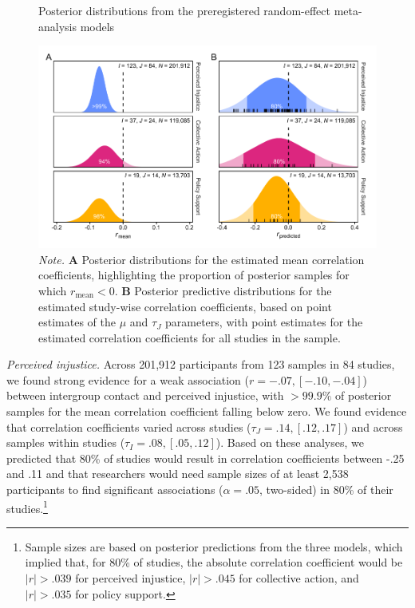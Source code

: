 \documentclass[twocolumn, 10pt, letterpaper]{article}
\begin{document}
\begin{figure}
\centering
\caption{Posterior distributions from the preregistered random-effect meta-analysis models}
\includegraphics[scale=1]{../figures/figure-3}
\caption*{\textit{Note.} \textbf{A} Posterior distributions for the estimated mean correlation coefficients, highlighting the proportion of posterior samples for which $r_\text{mean} < 0$. \textbf{B} Posterior predictive distributions for the estimated study-wise correlation coefficients, based on point estimates of the $\mu$ and $\tau_J$ parameters, with point estimates for the estimated correlation coefficients for all studies in the sample.}
\label{fig:f3}
\end{figure}

\emph{Perceived injustice.} Across 201,912 participants from 123 samples
in 84 studies, we found strong evidence for a weak association
(\(r = -.07, [-.10, -.04]\)) between intergroup contact and perceived
injustice, with \(>99.9\%\) of posterior samples for the mean
correlation coefficient falling below zero. We found evidence that
correlation coefficients varied across studies
(\(\tau_J = .14, [.12, .17]\)) and across samples within studies
(\(\tau_I = .08, [.05, .12]\)). Based on these analyses, we predicted
that 80\% of studies would result in correlation coefficients between
-.25 and .11 and that researchers would need sample sizes of at least
2,538 participants to find significant associations (\(\alpha = .05\),
two-sided) in 80\% of their studies.\footnote{Sample sizes are based on
  posterior predictions from the three models, which implied that, for
  80\% of studies, the absolute correlation coefficient would be
  \(|r| > .039\) for perceived injustice, \(|r| > .045\) for collective
  action, and \(|r| > .035\) for policy support.}
\end{document}
